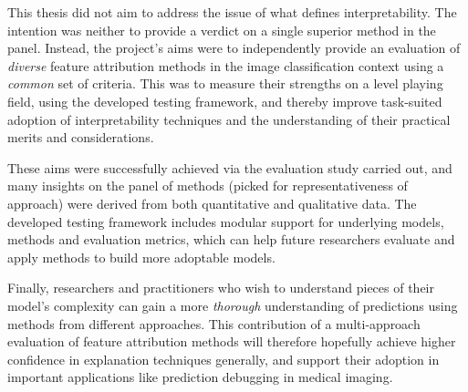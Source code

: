 \documentclass[main]{subfiles}
\begin{document}
This thesis did not aim to address the issue of what defines interpretability. The intention was neither to provide a verdict on a single superior method in the panel. Instead, the project's aims were to independently provide an evaluation of \textit{diverse} feature attribution methods in the image classification context using a \textit{common} set of criteria. This was to measure their strengths on a level playing field, using the developed testing framework, and thereby improve task-suited adoption of interpretability techniques and the understanding of their practical merits and considerations.

These aims were successfully achieved via the evaluation study carried out, and many insights on the panel of methods (picked for representativeness of approach) were derived from both quantitative and qualitative data. The developed testing framework includes modular support for underlying models, methods and evaluation metrics, which can help future researchers evaluate and apply methods to build more adoptable models.

Finally, researchers and practitioners who wish to understand pieces of their model's complexity can gain a more \textit{thorough} understanding of predictions using methods from different approaches. This contribution of a multi-approach evaluation of feature attribution methods will therefore hopefully achieve higher confidence in explanation techniques generally, and support their adoption in important applications like prediction debugging in medical imaging.
\end{document}
